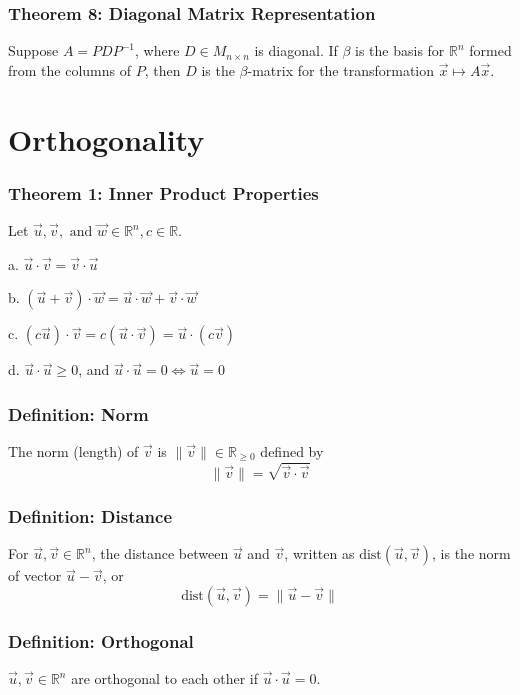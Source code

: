 \documentclass{article}
\begin{document}
\subsubsection*{Theorem 8: Diagonal Matrix Representation}
Suppose $A = P D P^{-1}$, where $D \in M_{n \times n}$ is diagonal. If $\beta$ is the basis for $\mathbb R ^n$ formed from the columns of $P$, then $D$ is the $\beta$-matrix for the transformation $\vec x \mapsto A \vec x$.

\section{Orthogonality}
\subsubsection*{Theorem 1: Inner Product Properties}
Let $\vec u, \vec v, \text{ and } \vec w \in \mathbb R^n , c \in \mathbb R$. 

a. $\vec u \cdot \vec v = \vec v \cdot \vec u$

b. $(\vec u + \vec v) \cdot \vec w = \vec u \cdot \vec w + \vec v \cdot \vec w$

c. $(c \vec u) \cdot \vec v = c( \vec u \cdot \vec v ) = \vec u \cdot (c \vec v)$

d. $\vec u \cdot \vec u \geq 0$, and $\vec u \cdot \vec u =0 \iff \vec u = 0$ 

\subsubsection*{Definition: Norm}
The norm (length) of $\vec v$ is $\| \vec v\| \in \mathbb R _{\geq 0}$ defined by 
$$\|\vec v\| = \sqrt{\vec v \cdot \vec v}$$

\subsubsection*{Definition: Distance}
For $\vec u , \vec v \in \mathbb R^n$, the distance between $\vec u$ and $\vec v$, written as $\text{dist}(\vec u, \vec v)$, is the norm of vector $\vec u - \vec v$, or 
$$\text{dist}(\vec u, \vec v) = \| \vec u - \vec v\|$$

\subsubsection*{Definition: Orthogonal}
$\vec u, \vec v \in \mathbb R^n$ are orthogonal to each other if $\vec u \cdot \vec u = 0$.
\end{document}
